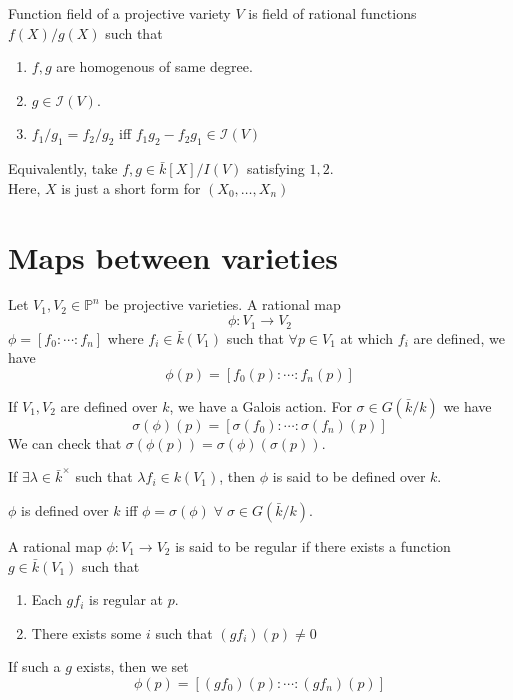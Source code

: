 \documentclass[oneside, 12pt, ]{scrbook}
\newcommand{\I}{\mathcal{I}}
\newcommand{\PP}{\mathbb{P}}
\theoremstyle{theorem}
\begin{document}
\begin{remark}
Function field of a projective variety $V$ is field of rational functions $f(X)/g(X)$ such that 
\begin{enumerate}
\item $f,g$ are homogenous of same degree. 
\item $g \in \I(V)$.
\item $f_{1}/g_{1} = f_{2}/g_{2}$ iff $f_{1}g_{2} - f_{2}g_{1} \in \I(V)$ 
\end{enumerate}
Equivalently, take $f,g \in \bar{k}[X]/I(V)$ satisfying $1,2$.\\

\textcolor{BrickRed}{Here, $X$ is just a short form for $(X_{0}, \hdots , X_{n})$}
\end{remark}

\section{Maps between varieties}

\begin{definition}
Let $V_{1},V_{2}\in \PP^n$ be projective varieties. A rational map $$\phi : V_{1} \rightarrow V_{2}$$ $\phi = [f_{0} : \cdots : f_{n}]$ where $f_{i} \in \bar{k}(V_{1})$ such that $\forall p \in V_{1}$ at which $f_{i}$ are defined, we have $$\phi(p)= [f_{0}(p): \cdots : f_{n}(p)]$$
\end{definition}

If $V_{1},V_{2}$ are defined over $k$, we have a Galois action. For $\sigma \in G(\bar{k}/k)$ we have $$\sigma(\phi)(p) = [\sigma(f_{0}): \cdots : \sigma(f_{n})(p)]$$
We can check that $\sigma(\phi(p)) = \sigma(\phi)(\sigma(p))$.\\

\begin{definition}
If $\exists \lambda \in \bar{k}^{\times}$ such that $\lambda f_{i} \in k(V_{1})$, then $\phi$ is said to be defined over $k$.
\end{definition}

\begin{proposition}
$\phi$ is defined over $k$ iff $\phi =\sigma(\phi) \; \forall \; \sigma \in G(\bar{k}/k)$.
\end{proposition}

\begin{definition}
A rational map $\phi: V_{1} \rightarrow V_{2}$ is said to be regular if there exists a function $g \in \bar{k}(V_{1})$ such that 
\begin{enumerate}
\item Each $gf_{i}$ is regular at $p$.
\item There exists some $i$ such that $(gf_{i})(p) \neq 0$
\end{enumerate}
If such a $g$ exists, then we set $$\phi(p) = [(gf_{0})(p) : \cdots : (gf_{n})(p)]$$
\end{definition}
\end{document}
